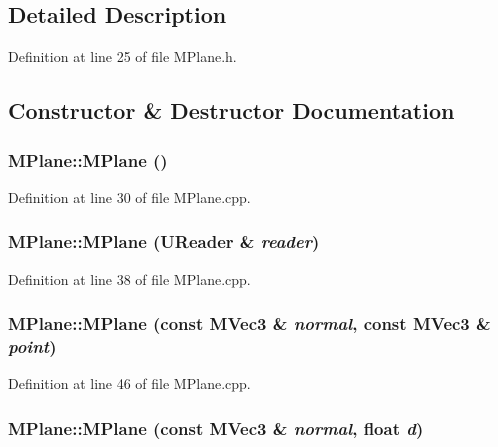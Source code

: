 \subsection{Detailed Description}


Definition at line 25 of file MPlane.h.

\subsection{Constructor \& Destructor Documentation}
\hypertarget{class_m_plane_05f80146f7924ba17f387847ad4562a6}{
\subsubsection[{MPlane}]{\setlength{\rightskip}{0pt plus 5cm}MPlane::MPlane ()}}
\label{class_m_plane_05f80146f7924ba17f387847ad4562a6}




Definition at line 30 of file MPlane.cpp.\hypertarget{class_m_plane_4284b8ea0623a916fab4a8d8dc7309b2}{
\subsubsection[{MPlane}]{\setlength{\rightskip}{0pt plus 5cm}MPlane::MPlane ({\bf UReader} \& {\em reader})}}
\label{class_m_plane_4284b8ea0623a916fab4a8d8dc7309b2}




Definition at line 38 of file MPlane.cpp.\hypertarget{class_m_plane_28191a178c76b234747571d819b71cf5}{
\subsubsection[{MPlane}]{\setlength{\rightskip}{0pt plus 5cm}MPlane::MPlane (const {\bf MVec3} \& {\em normal}, \/  const {\bf MVec3} \& {\em point})}}
\label{class_m_plane_28191a178c76b234747571d819b71cf5}




Definition at line 46 of file MPlane.cpp.\hypertarget{class_m_plane_6195235398e2dd4ef5d0614c0f08b517}{
\subsubsection[{MPlane}]{\setlength{\rightskip}{0pt plus 5cm}MPlane::MPlane (const {\bf MVec3} \& {\em normal}, \/  float {\em d})}}
\label{class_m_plane_6195235398e2dd4ef5d0614c0f08b517}




